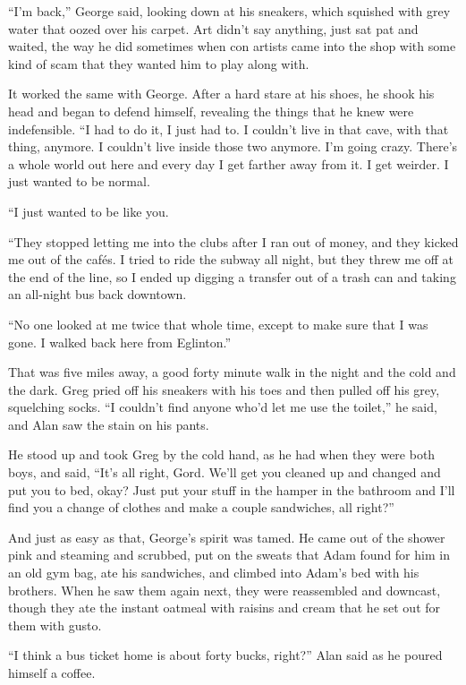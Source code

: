 ``I'm back,'' George said, looking down at his sneakers, which
squished with grey water that oozed over his carpet.  Art didn't say
anything, just sat pat and waited, the way he did sometimes when con
artists came into the shop with some kind of scam that they wanted him
to play along with.

It worked the same with George.  After a hard stare at his shoes, he
shook his head and began to defend himself, revealing the things that
he knew were indefensible.  ``I had to do it, I just had to.  I
couldn't live in that cave, with that thing, anymore.  I couldn't live
inside those two anymore.  I'm going crazy.  There's a whole world out
here and every day I get farther away from it.  I get weirder.  I just
wanted to be normal.

``I just wanted to be like you.

``They stopped letting me into the clubs after I ran out of money, and
they kicked me out of the caf\'{e}s.  I tried to ride the subway all
night, but they threw me off at the end of the line, so I ended up
digging a transfer out of a trash can and taking an all-night bus back
downtown.

``No one looked at me twice that whole time, except to make sure that
I was gone.  I walked back here from Eglinton.''

That was five miles away, a good forty minute walk in the night and
the cold and the dark.  Greg pried off his sneakers with his toes and
then pulled off his grey, squelching socks.  ``I couldn't find anyone
who'd let me use the toilet,'' he said, and Alan saw the stain on his
pants.

He stood up and took Greg by the cold hand, as he had when they were
both boys, and said, ``It's all right, Gord.  We'll get you cleaned up
and changed and put you to bed, okay?  Just put your stuff in the
hamper in the bathroom and I'll find you a change of clothes and make
a couple sandwiches, all right?''

And just as easy as that, George's spirit was tamed.  He came out of
the shower pink and steaming and scrubbed, put on the sweats that Adam
found for him in an old gym bag, ate his sandwiches, and climbed into
Adam's bed with his brothers.  When he saw them again next, they were
reassembled and downcast, though they ate the instant oatmeal with
raisins and cream that he set out for them with gusto.

``I think a bus ticket home is about forty bucks, right?'' Alan said
as he poured himself a coffee.

